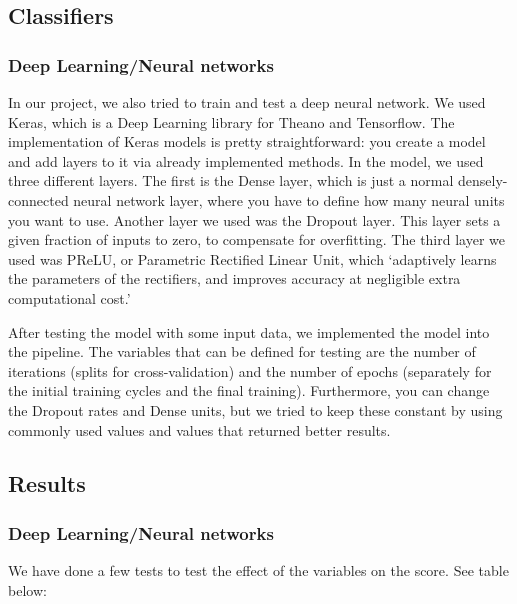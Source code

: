 \usepackage{booktabs}

\subsection{Classifiers}

\subsubsection{Deep Learning/Neural networks}

In our project, we also tried to train and test a deep neural network. We used Keras, which is a Deep Learning library for Theano and Tensorflow. The implementation of Keras models is pretty straightforward: you create a model and add layers to it via already implemented methods. In the model, we used three different layers. The first is the Dense layer, which is just a normal densely-connected neural network layer, where you have to define how many neural units you want to use. Another layer we used was the Dropout layer. This layer sets a given fraction of inputs to zero, to compensate for overfitting. The third layer we used was PReLU, or Parametric Rectified Linear Unit, which `adaptively learns the parameters of the rectifiers, and improves accuracy at negligible extra computational cost.' \cite{PReLU}

After testing the model with some input data, we implemented the model into the pipeline. The variables that can be defined for testing are the number of iterations (splits for cross-validation) and the number of epochs (separately for the initial training cycles and the final training). Furthermore, you can change the Dropout rates and Dense units, but we tried to keep these constant by using commonly used values and values that returned better results.

\subsection{Results}

\subsubsection{Deep Learning/Neural networks}

We have done a few tests to test the effect of the variables on the score. See table below:

